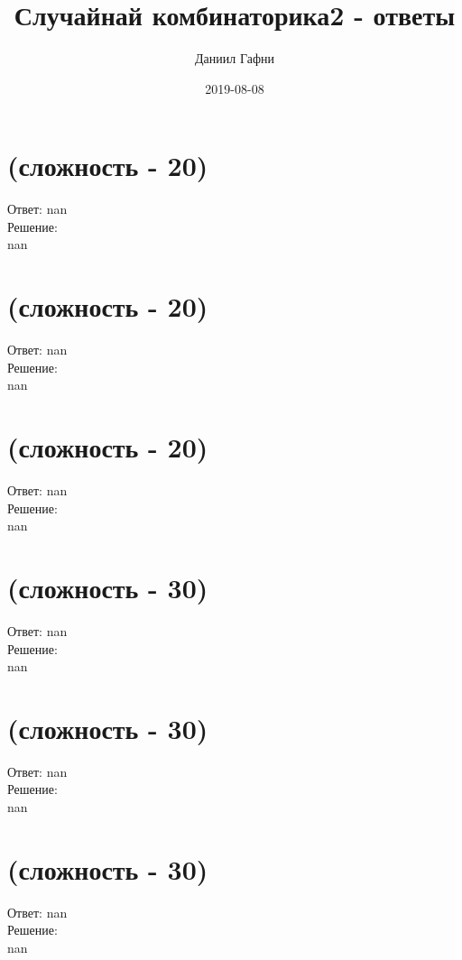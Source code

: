\documentclass[a4paper,11pt]{article}%
\title{Случайнай комбинаторика2 {-} ответы}%
\author{Даниил Гафни}%
\date{2019{-}08{-}08}%
\begin{document}
%
\normalsize%
\maketitle%
\section{(сложность {-} 20)}%
\label{sec:( {-} 20)}%
\hspace{3ex} Ответ: nan \\%
%
\hspace*{3ex} Решение: \\%
nan

%
\section{(сложность {-} 20)}%
\label{sec:( {-} 20)}%
\hspace{3ex} Ответ: nan \\%
%
\hspace*{3ex} Решение: \\%
nan

%
\section{(сложность {-} 20)}%
\label{sec:( {-} 20)}%
\hspace{3ex} Ответ: nan \\%
%
\hspace*{3ex} Решение: \\%
nan

%
\section{(сложность {-} 30)}%
\label{sec:( {-} 30)}%
\hspace{3ex} Ответ: nan \\%
%
\hspace*{3ex} Решение: \\%
nan

%
\section{(сложность {-} 30)}%
\label{sec:( {-} 30)}%
\hspace{3ex} Ответ: nan \\%
%
\hspace*{3ex} Решение: \\%
nan

%
\section{(сложность {-} 30)}%
\label{sec:( {-} 30)}%
\hspace{3ex} Ответ: nan \\%
%
\hspace*{3ex} Решение: \\%
nan
\end{document}

